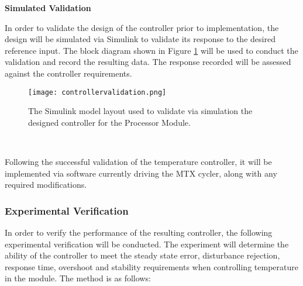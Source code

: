 \textbf{Simulated Validation}

In order to validate the design of the controller prior to implementation, the design will be simulated via Simulink to validate its response to the desired reference input. The block diagram shown in Figure \ref{fig:controllervalidation} will be used to conduct the validation and record the resulting data. The response recorded will be assessed against the controller requirements.

\begin{figure}[!htb]
	\centering
	\texttt{[image: controllervalidation.png]}
	\caption[Controller valiation Simulink Model.]{The Simulink model layout used to validate via simulation the designed controller for the Processor Module.}
	\label{fig:controllervalidation}
\end{figure} 
\FloatBarrier

Following the successful validation of the temperature controller, it will be implemented via software currently driving the MTX cycler, along with any required modifications.


\subsubsection{Experimental Verification}

In order to verify the performance of the resulting controller, the following experimental verification will be conducted. The experiment will determine the ability of the controller to meet the steady state error, disturbance rejection, response time, overshoot and stability requirements when controlling temperature in the module. The method is as follows:

